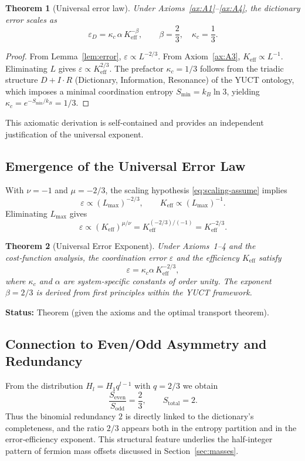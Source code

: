 \documentclass[12pt,a4paper]{article}
\newtheorem{theorem}{Theorem}[section]
\begin{document}
	\begin{theorem}[Universal error law]
		Under Axioms~\ref{ax:A1}--\ref{ax:A4}, the dictionary error scales as
		\[
		\boxed{\varepsilon_D = \kappa_c \, \alpha \, K_{\mathrm{eff}}^{-\beta}, \qquad \beta = \frac{2}{3}, \quad \kappa_c = \frac{1}{3}}.
		\]
	\end{theorem}
	\begin{proof}
		From Lemma~\ref{lem:error}, \(\varepsilon \propto L^{-2/3}\). From Axiom~\ref{ax:A3}, \(K_{\mathrm{eff}} \propto L^{-1}\). Eliminating \(L\) gives \(\varepsilon \propto K_{\mathrm{eff}}^{2/3}\). The prefactor \(\kappa_c = 1/3\) follows from the triadic structure \(D+I\cdot R\) (Dictionary, Information, Resonance) of the YUCT ontology, which imposes a minimal coordination entropy \(S_{\min} = k_B \ln 3\), yielding \(\kappa_c = e^{-S_{\min}/k_B} = 1/3\).
	\end{proof}
	
	This axiomatic derivation is self‑contained and provides an independent justification of the universal exponent.
	
	\subsection{Emergence of the Universal Error Law}
	With \(\nu = -1\) and \(\mu = -2/3\), the scaling hypothesis \eqref{eq:scaling-assume} implies
	\[
	\varepsilon \propto (L_{\max})^{-2/3}, \qquad K_{\mathrm{eff}} \propto (L_{\max})^{-1}.
	\]
	Eliminating \(L_{\max}\) gives
	\[
	\varepsilon \propto (K_{\mathrm{eff}})^{\mu/\nu} = K_{\mathrm{eff}}^{(-2/3)/(-1)} = K_{\mathrm{eff}}^{-2/3}.
	\]
	
	\begin{theorem}[Universal Error Exponent]
		Under Axioms~1–4 and the cost‑function analysis, the coordination error \(\varepsilon\) and the efficiency \(K_{\mathrm{eff}}\) satisfy
		\[
		\boxed{\varepsilon = \kappa_c \alpha \, K_{\mathrm{eff}}^{-2/3}},
		\]
		where \(\kappa_c\) and \(\alpha\) are system‑specific constants of order unity. The exponent \(\beta = 2/3\) is derived from first principles within the YUCT framework.
	\end{theorem}
	\textbf{Status:} Theorem (given the axioms and the optimal transport theorem).
	
	\subsection{Connection to Even/Odd Asymmetry and Redundancy}
	From the distribution \(H_l = H_1 q^{l-1}\) with \(q=2/3\) we obtain
	\[
	\frac{S_{\mathrm{even}}}{S_{\mathrm{odd}}} = \frac{2}{3}, \qquad S_{\mathrm{total}} = 2.
	\]
	Thus the binomial redundancy \(2\) is directly linked to the dictionary's completeness, and the ratio \(2/3\) appears both in the entropy partition and in the error‑efficiency exponent. This structural feature underlies the half‑integer pattern of fermion mass offsets discussed in Section~\ref{sec:masses}.
	
\end{document}
